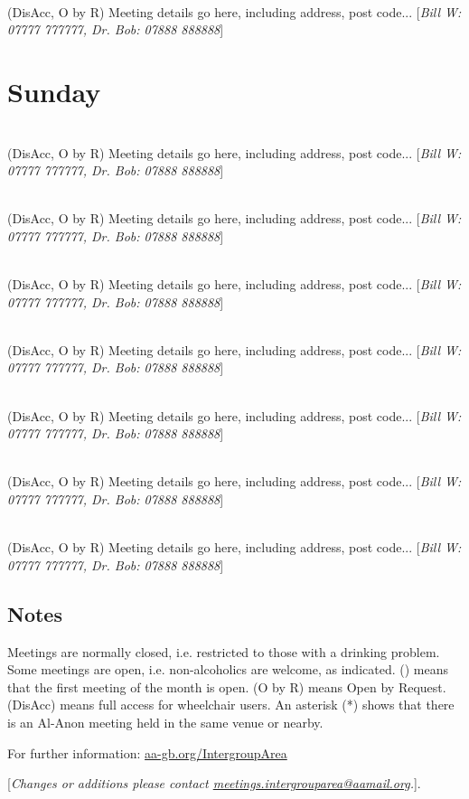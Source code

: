 \documentclass[a4paper]{article}
\newcommand{\mtgname}[1] {\vspace{0.1cm}{\bf #1}\\}   %
\newcommand{\mtgtime}[1] {\hspace{-0.2cm}{\small #1}} %
\newcommand{\mtgdetails}[1] {#1}                      %
\newcommand{\mtgphones}[1] {[\textit{#1}]}            %
\begin{document}
\mtgname{Meeting name goes here}
\mtgtime{12:45--13:45} \mtgdetails{(DisAcc, O by R) Meeting details go here, including address, post code...}
\mtgphones{Bill W: 07777 777777, Dr. Bob: 07888 888888}

\section*{Sunday}

\mtgname{Meeting name goes here}
\mtgtime{12:45--13:45} \mtgdetails{(DisAcc, O by R) Meeting details go here, including address, post code...}
\mtgphones{Bill W: 07777 777777, Dr. Bob: 07888 888888}

\mtgname{Meeting name goes here}
\mtgtime{12:45--13:45} \mtgdetails{(DisAcc, O by R) Meeting details go here, including address, post code...}
\mtgphones{Bill W: 07777 777777, Dr. Bob: 07888 888888}

\mtgname{Meeting name goes here}
\mtgtime{12:45--13:45} \mtgdetails{(DisAcc, O by R) Meeting details go here, including address, post code...}
\mtgphones{Bill W: 07777 777777, Dr. Bob: 07888 888888}

\mtgname{Meeting name goes here}
\mtgtime{12:45--13:45} \mtgdetails{(DisAcc, O by R) Meeting details go here, including address, post code...}
\mtgphones{Bill W: 07777 777777, Dr. Bob: 07888 888888}

\mtgname{Meeting name goes here}
\mtgtime{12:45--13:45} \mtgdetails{(DisAcc, O by R) Meeting details go here, including address, post code...}
\mtgphones{Bill W: 07777 777777, Dr. Bob: 07888 888888}

\mtgname{Meeting name goes here}
\mtgtime{12:45--13:45} \mtgdetails{(DisAcc, O by R) Meeting details go here, including address, post code...}
\mtgphones{Bill W: 07777 777777, Dr. Bob: 07888 888888}

\mtgname{Meeting name goes here}
\mtgtime{12:45--13:45} \mtgdetails{(DisAcc, O by R) Meeting details go here, including address, post code...}
\mtgphones{Bill W: 07777 777777, Dr. Bob: 07888 888888}


\newpage{}

\subsection*{Notes}

{\small \nopagebreak Meetings are normally closed, i.e. restricted to those with a drinking problem. Some meetings are open, i.e. non-alcoholics are welcome, as indicated. () means that the first meeting of the month is open. (O by R) means Open by Request. (DisAcc) means full access for wheelchair users. An asterisk (*) shows that there is an Al-Anon meeting held in the same venue or nearby.  

For further information: \href{https://aa-gb.org/IntergroupArea}{aa-gb.org/IntergroupArea}

\mtgphones{Changes or additions please contact \href{mailto:meetings.intergrouparea@aamail.org}{meetings.intergrouparea@aamail.org}.}.}
\end{document}
